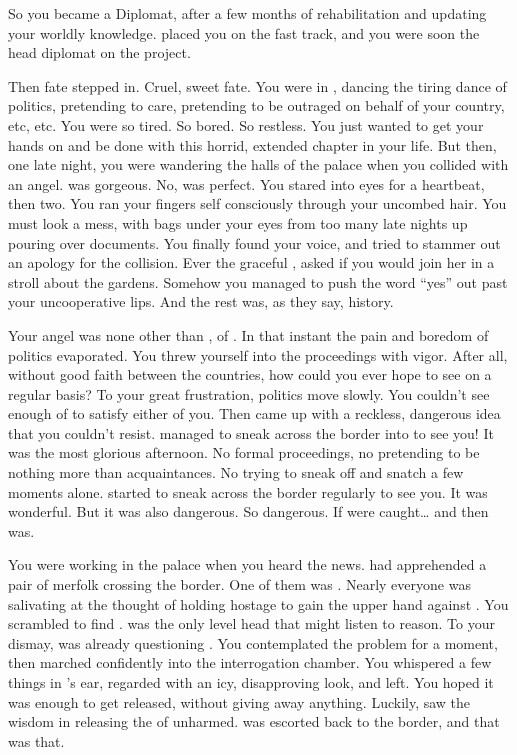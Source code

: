 \documentclass[char]{NeptuneBall}
\begin{document}
So you became a Diplomat, after a few months of rehabilitation and updating your worldly knowledge.  \pAssassin{} placed you on the fast track, and you were soon the head diplomat on the project. 

Then fate stepped in. Cruel, sweet fate. You were in \pAtlantis{}, dancing the tiring dance of politics, pretending to care, pretending to be outraged on behalf of your country, etc, etc. You were so tired. So bored. So restless. You just wanted to get your hands on \cQueen{} and be done with this horrid, extended chapter in your life. But then, one late night, you were wandering the halls of the palace when you collided with an angel. \cPrincess{\They} was gorgeous. No, \cPrincess{\they} was perfect. You stared into \cPrincess{\them} eyes for a heartbeat, then two. You ran your fingers self consciously through your uncombed hair. You must look a mess, with bags under your eyes from too many late nights up pouring over documents.  You finally found your voice, and tried to stammer out an apology for the collision. Ever the graceful \cPrincess{\prince}, \cPrincess{\they} asked if you would join her in a stroll about the gardens. Somehow you managed to push the word ``yes'' out past your uncooperative lips. And the rest was, as they say, history.

Your angel was none other than \cPrincess{}, \cPrincess{\prince} of \pAtlantis{}. In that instant the pain and boredom of politics evaporated. You threw yourself into the proceedings with vigor. After all, without good faith between the countries, how could you ever hope to see \cPrincess{} on a regular basis? To your great frustration, politics move slowly. You couldn't see enough of \cPrincess{} to satisfy either of you. Then \cPrincess{\they} came up with a reckless, dangerous idea that you couldn't resist. \cPrincess{\They} managed to sneak across the border into \pPacifica{} to see you! It was the most glorious afternoon. No formal proceedings, no pretending to be nothing more than acquaintances. No trying to sneak off and snatch a few moments alone. \cPrincess{\They} started to sneak across the border regularly to see you. It was wonderful. But it was also dangerous. So dangerous. If \cPrincess{\they} were caught\ldots{} and then \cPrincess{\they} was.

You were working in the palace when you heard the news. \cPrince{\Prince} \cPrince{} had apprehended a pair of merfolk crossing the border. One of them was \cPrincess{\prince} \cPrincess{}. Nearly everyone was salivating at the thought of holding \cPrincess{\them} hostage to gain the upper hand against \pAtlantis{}. You scrambled to find \cPrince{}. \cPrince{\They} was the only level head that might listen to reason. To your dismay, \cPrince{\they} was already questioning \cPrincess{}. You contemplated the problem for a moment, then marched confidently into the interrogation chamber. You whispered a few things in \cPrince{}'s ear, regarded \cPrincess{} with an icy, disapproving look, and left. You hoped it was enough to get \cPrincess{\them} released, without giving away anything. Luckily, \cPrince{} saw the wisdom in releasing the \cPrincess{\prince} of \pAtlantis{} unharmed. \cPrincess{} was escorted back to the border, and that was that.
\end{document}
